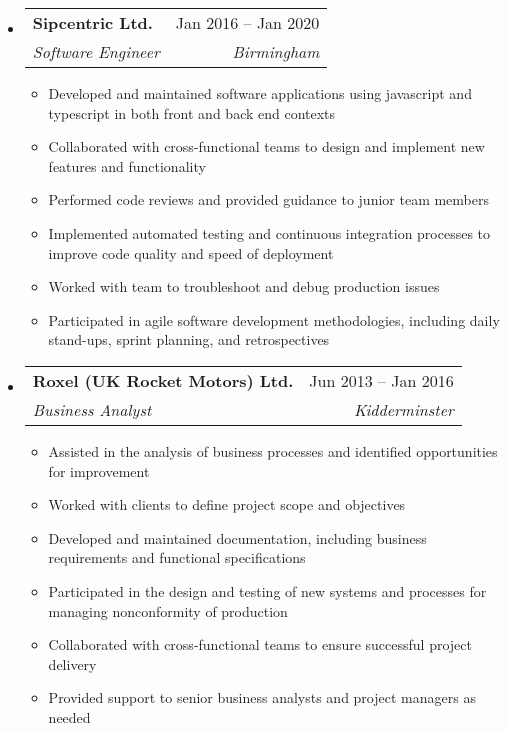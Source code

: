 \documentclass[letterpaper,12pt]{article}[leftmargin=*]
\makeatletter
\def \entryspacing {-0pt}
\renewcommand{\section}[2]{\vspace{5pt}
  \colorbox{secondary}{\color{white}\raggedbottom\normalsize\textbf{{#1}{\hspace{7pt}#2}}}
}
\newcommand{\resumeEntryStart}{\begin{itemize}[leftmargin=2.5mm]}
\newcommand{\resumeEntryEnd}{\end{itemize}\vspace{\entryspacing}}
\newcommand{\resumeItemListStart}{\begin{itemize}[leftmargin=4.5mm]}
\newcommand{\resumeItemListEnd}{\end{itemize}}
\newcommand{\resumeItem}[1]{
  \item\small{
    {#1 \vspace{-2pt}}
  }
}
\newcommand{\resumeEntryTSDL}[4]{
  \vspace{-1pt}\item[]
    \begin{tabularx}{0.97\textwidth}{X@{\hspace{60pt}}r}
      \textbf{\color{primary}#1} & {\firabook\color{accent}\small#2} \\
      \textit{\color{accent}\small#3} & \textit{\color{accent}\small#4} \\
    \end{tabularx}\vspace{-6pt}
}
\newcommand{\resumeEntryS}[2]{
  \item[]\small{
    \textbf{\color{primary}#1 }{ #2 \vspace{-6pt}}
  }
}
\makeatother
\begin{document}
  \resumeEntryStart
    \resumeEntryTSDL
      {Sipcentric Ltd.}{Jan 2016 -- Jan 2020}
      {Software Engineer}{Birmingham}
    \resumeItemListStart
      \resumeItem {Developed and maintained software applications using javascript and typescript in both front and back end contexts}
      \resumeItem {Collaborated with cross-functional teams to design and implement new features and functionality}
      \resumeItem {Performed code reviews and provided guidance to junior team members}
      \resumeItem {Implemented automated testing and continuous integration processes to improve code quality and speed of deployment}
      \resumeItem {Worked with team to troubleshoot and debug production issues}
      \resumeItem {Participated in agile software development methodologies, including daily stand-ups, sprint planning, and retrospectives}
    \resumeItemListEnd
  \resumeEntryEnd

  \resumeEntryStart
    \resumeEntryTSDL
      {Roxel (UK Rocket Motors) Ltd.}{Jun 2013 -- Jan 2016}
      {Business Analyst}{Kidderminster}
    \resumeItemListStart
        \resumeItem {Assisted in the analysis of business processes and identified opportunities for improvement}
        \resumeItem {Worked with clients to define project scope and objectives}
        \resumeItem {Developed and maintained documentation, including business requirements and functional specifications}
        \resumeItem {Participated in the design and testing of new systems and processes for managing nonconformity of production}
        \resumeItem {Collaborated with cross-functional teams to ensure successful project delivery}
        \resumeItem {Provided support to senior business analysts and project managers as needed}
    \resumeItemListEnd
  \resumeEntryEnd

\end{document}
